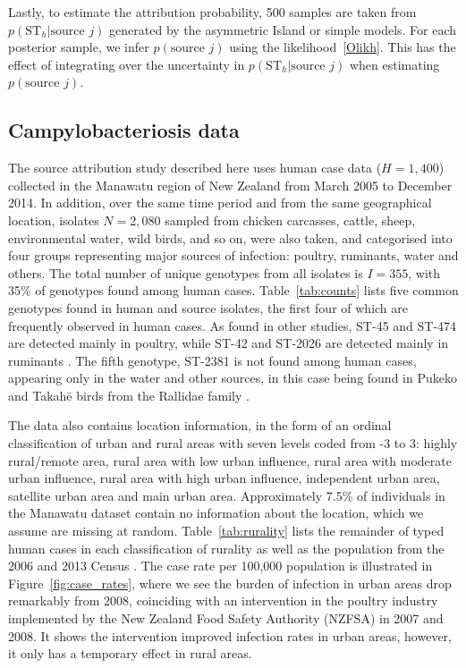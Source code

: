 \documentclass[AMA,STIX1COL]{WileyNJD-v2}
\begin{document}
Lastly, to estimate the attribution probability, 500 samples are taken from $p(\text{ST}_h \vert \text{source }j)$ generated by the asymmetric Island or simple models. For each posterior sample, we infer $p(\text{source }j)$ using the likelihood~\eqref{Olikh}. This has the effect of integrating over the uncertainty in $p(\text{ST}_h \vert \text{source }j)$ when estimating $p(\text{source }j)$.

\subsection{Campylobacteriosis data}

The source attribution study described here uses human case data ($H=1,400$) collected in the Manawatu region of New Zealand from March 2005 to December 2014. In addition, over the same time period and from the same geographical location, isolates $N=2,080$ sampled from chicken carcasses, cattle, sheep, environmental water, wild birds, and so on, were also taken, and categorised into four groups  representing major sources of infection: poultry, ruminants, water and others. The total number of unique genotypes from all isolates is $I=355$, with 35\% of genotypes found among human cases. Table~\ref{tab:counts} lists five common genotypes found in human and source isolates, the first four of which are frequently observed in human cases. As found in other studies, ST-45 and ST-474 are detected mainly in poultry, while ST-42 and ST-2026 are detected mainly in ruminants \cite{Muell, Coll, Cart}. The fifth genotype, ST-2381 is not found among human cases, appearing only in the water and other sources, in this case being found in Pukeko and Takah\={e} birds from the Rallidae family \cite{french2014evolution}.

The data also contains location information, in the form of an ordinal classification of urban and rural areas with seven levels coded from -3 to 3: highly rural/remote area, rural area with low urban influence, rural area with moderate urban influence, rural area with high urban influence, independent urban area, satellite urban area and main urban area. Approximately 7.5\% of individuals in the Manawatu dataset contain no information about the location, which we assume are missing at random. Table~\ref{tab:rurality} lists the remainder of typed human cases in each classification of rurality as well as the population from the 2006 and 2013 Census \cite{Stat1, Stat2}. The case rate per 100,000 population is illustrated in Figure~\ref{fig:case_rates}, where we see the burden of infection in urban areas drop remarkably from 2008, coinciding with an intervention in the poultry industry implemented by the New Zealand Food Safety Authority (NZFSA) in 2007 and 2008. It shows the intervention improved infection rates in urban areas, however, it only has a temporary effect in rural areas.
\end{document}
